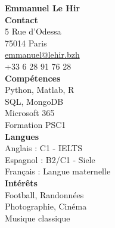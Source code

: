 \documentclass[a4paper,10pt]{article}
\begin{document}

\noindent
\begin{minipage}[t]{0.33\textwidth}
    \vspace{1cm}
    \textbf{Emmanuel Le Hir} \\
    \vspace{0.3cm}
    \textbf{Contact} \\
    5 Rue d'Odessa \\
    75014 Paris \\
    \href{mailto:emmanuel@lehir.bzh}{emmanuel@lehir.bzh} \\
    +33 6 28 91 76 28 \\
    \vspace{0.3cm}
    \textbf{Compétences} \\
    Python, Matlab, R \\
    SQL, MongoDB \\
    Microsoft 365 \\
    Formation PSC1 \\
    \vspace{0.3cm}
    \textbf{Langues} \\
    Anglais : C1 - IELTS \\
    Espagnol : B2/C1 - Siele \\
    Français : Langue maternelle \\
    \vspace{0.3cm}
    \textbf{Intérêts} \\
    Football, Randonnées \\
    Photographie, Cinéma \\
    Musique classique \\
\end{minipage}%
\hfill
\end{document}
